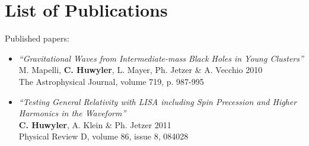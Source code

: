 \def\sig{\mbox{$\sigma$}}
\def\sigc{\mbox{$\sigma_{0}$}}

\def\gZ{\mbox{$\nabla_{\rm Z}$}}
\def\gage{\mbox{$\nabla_{\rm age}$}}
\def\gML{\mbox{$\nabla_{\rm \tiny \Yst}$}}

\def\gug{\mbox{$\nabla_{\rm u-g}$}}
\def\ggr{\mbox{$\nabla_{\rm g-r}$}}
\def\ggi{\mbox{$\nabla_{\rm g-i}$}}
\def\ggz{\mbox{$\nabla_{\rm g-z}$}}


\def\Ngr{\mbox{$\rm N_{\rm gr}$}}
\def\Ie{\mbox{$I_{\rm eff}$}}
\newcommand{\mie}{$<\! \mu\! >_{\rm e}$}



\newpage




\section*{List of Publications}

Published papers:


\begin{itemize}
\item \emph{``Gravitational Waves from Intermediate-mass Black Holes in Young Clusters''}\\ 
       M. Mapelli, {\bf C. Huwyler}, L. Mayer, Ph. Jetzer \& A. Vecchio 2010\\
       The Astrophysical Journal, volume 719, p. 987-995
\end{itemize}

\begin{itemize}
\item \emph{``Testing General Relativity with LISA including Spin Precession and Higher Harmonics in the Waveform''}\\ 
      {\bf C. Huwyler}, A. Klein \& Ph. Jetzer 2011\\
      Physical Review D, volume 86, issue 8, 084028
\end{itemize}


